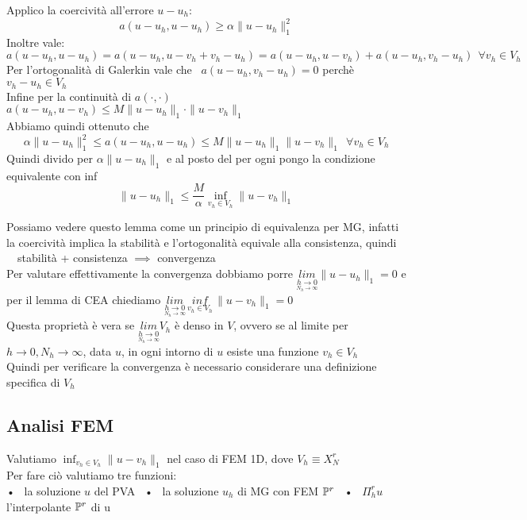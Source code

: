 \documentclass{article}
\begin{document}
\begin{Dim}
    Applico la coercività all'errore $u-u_h$:
    \[
    a(u-u_h,u-u_h)\ge \alpha \|u-u_h\|_1^2
    \]
    Inoltre vale:
    \[
    a(u-u_h,u-u_h) = a(u-u_h,u-v_h +v_h -u_h) = a(u-u_h,u-v_h) + a(u-u_h,v_h-u_h) \ \ \forall v_h\in V_h
    \]
    Per l'ortogonalità di Galerkin vale che \ $a(u-u_h,v_h-u_h)=0$ perchè $v_h-u_h \in V_h$\\
    Infine per la continuità di $a(\cdot,\cdot)$ \ $a(u-u_h,u-v_h)\le M\|u-u_h\|_1 \cdot \|u-v_h\|_1$\\
    Abbiamo quindi ottenuto che
    \[
    \alpha \|u-u_h\|_1^2 \le a(u-u_h,u-u_h) \le M\|u-u_h\|_1 \|u-v_h\|_1 \ \ \forall v_h\in V_h
    \]
    Quindi divido per $\alpha \|u-u_h\|_1$ e al posto del per ogni pongo la condizione equivalente con inf
    \[
    \|u-u_h\|_1 \le \frac{M}{\alpha} \inf_{v_h\in V_h}\|u-v_h\|_1
    \]
\end{Dim}


Possiamo vedere questo lemma come un principio di equivalenza per MG, infatti la coercività implica la stabilità e l'ortogonalità equivale alla consistenza, quindi \ \ stabilità + consistenza $\implies $ convergenza\\

Per valutare effettivamente la convergenza dobbiamo porre $\underset{\underset{N_h\to \infty}{h\to 0}}{lim}\|u-u_h\|_1=0$ e per il lemma di CEA chiediamo $\underset{\underset{N_h\to \infty}{h\to 0}}{lim}\, \underset{v_h\in V_h}{inf}\, \|u-v_h\|_1=0$\\

Questa proprietà è vera se $\underset{\underset{N_h\to \infty}{h\to 0}}{lim} V_h$ è denso in $V$, ovvero se al limite per $h\to0, N_h\to \infty$, data $u$, in ogni intorno di $u$ esiste una funzione $v_h\in V_h$\\

Quindi per verificare la convergenza è necessario considerare una definizione specifica di $V_h$ %
\newpage

\subsection{Analisi FEM}

Valutiamo $\displaystyle \inf_{v_h\in V_h}\|u-v_h\|_1$ nel caso di FEM 1D, dove $V_h\equiv X_N^r$\\
Per fare ciò valutiamo tre funzioni:\\
• \ la soluzione $u$ del PVA  \ • \ la soluzione $u_h$ di MG con FEM $\mathbb P^r$ \ • \ $\Pi_h^r u$ l'interpolante $\mathbb P^r$ di u\\
\end{document}
